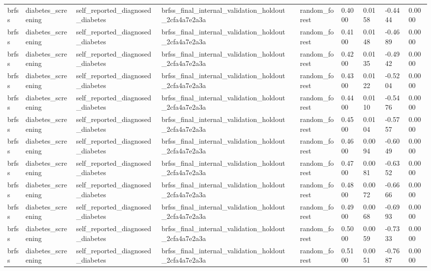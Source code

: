 \begin{tabular}{llllllllll}
brfss & diabetes\_screening & self\_reported\_diagnosed\_diabetes & brfss\_final\_internal\_validation\_holdout\_2cfa4a7e2a3a &  & random\_forest & 0.4000 & 0.0158 & -0.4444 & 0.0000 \\
brfss & diabetes\_screening & self\_reported\_diagnosed\_diabetes & brfss\_final\_internal\_validation\_holdout\_2cfa4a7e2a3a &  & random\_forest & 0.4100 & 0.0148 & -0.4689 & 0.0000 \\
brfss & diabetes\_screening & self\_reported\_diagnosed\_diabetes & brfss\_final\_internal\_validation\_holdout\_2cfa4a7e2a3a &  & random\_forest & 0.4200 & 0.0135 & -0.4942 & 0.0000 \\
brfss & diabetes\_screening & self\_reported\_diagnosed\_diabetes & brfss\_final\_internal\_validation\_holdout\_2cfa4a7e2a3a &  & random\_forest & 0.4300 & 0.0122 & -0.5204 & 0.0000 \\
brfss & diabetes\_screening & self\_reported\_diagnosed\_diabetes & brfss\_final\_internal\_validation\_holdout\_2cfa4a7e2a3a &  & random\_forest & 0.4400 & 0.0110 & -0.5476 & 0.0000 \\
brfss & diabetes\_screening & self\_reported\_diagnosed\_diabetes & brfss\_final\_internal\_validation\_holdout\_2cfa4a7e2a3a &  & random\_forest & 0.4500 & 0.0104 & -0.5757 & 0.0000 \\
brfss & diabetes\_screening & self\_reported\_diagnosed\_diabetes & brfss\_final\_internal\_validation\_holdout\_2cfa4a7e2a3a &  & random\_forest & 0.4600 & 0.0094 & -0.6049 & 0.0000 \\
brfss & diabetes\_screening & self\_reported\_diagnosed\_diabetes & brfss\_final\_internal\_validation\_holdout\_2cfa4a7e2a3a &  & random\_forest & 0.4700 & 0.0081 & -0.6352 & 0.0000 \\
brfss & diabetes\_screening & self\_reported\_diagnosed\_diabetes & brfss\_final\_internal\_validation\_holdout\_2cfa4a7e2a3a &  & random\_forest & 0.4800 & 0.0072 & -0.6666 & 0.0000 \\
brfss & diabetes\_screening & self\_reported\_diagnosed\_diabetes & brfss\_final\_internal\_validation\_holdout\_2cfa4a7e2a3a &  & random\_forest & 0.4900 & 0.0068 & -0.6993 & 0.0000 \\
brfss & diabetes\_screening & self\_reported\_diagnosed\_diabetes & brfss\_final\_internal\_validation\_holdout\_2cfa4a7e2a3a &  & random\_forest & 0.5000 & 0.0059 & -0.7333 & 0.0000 \\
brfss & diabetes\_screening & self\_reported\_diagnosed\_diabetes & brfss\_final\_internal\_validation\_holdout\_2cfa4a7e2a3a &  & random\_forest & 0.5100 & 0.0051 & -0.7687 & 0.0000 \\

\end{tabular}
